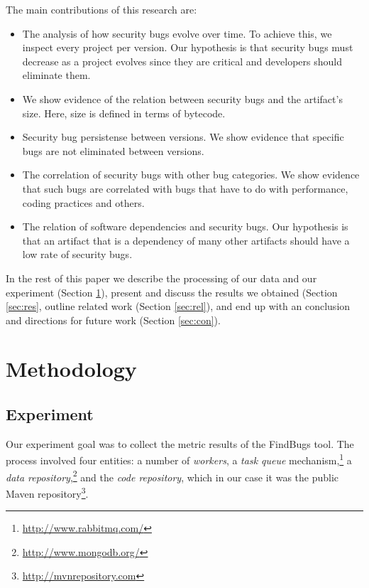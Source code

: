 \documentclass[conference]{IEEEtran}
\begin{document}
The main contributions of this research are:

\begin{itemize}
	\item The analysis of how security bugs evolve over time. To achieve
this, we inspect every project per version. Our hypothesis is that security
bugs must decrease as a project evolves since they are critical and developers
should eliminate them.
	\item We show evidence of the relation between security bugs and the artifact's size.  Here, size is
defined in terms of bytecode.
	\item Security bug persistense between versions. We show evidence that specific bugs are
not eliminated between versions.
	\item The correlation of security bugs with other bug categories. We
show evidence that such bugs are correlated with bugs that have to do with
performance, coding practices and others.
	\item The relation of software dependencies and security bugs. Our
hypothesis is that an artifact that is a dependency of many other artifacts
should have a low rate of security bugs. 
\end{itemize}

In the rest of this paper we
describe the processing of our data and our experiment (Section \ref{sec:meth}),
present and discuss the results we obtained (Section \ref{sec:res},
outline related work (Section \ref{sec:rel}),
and end up with an conclusion and directions for future work (Section \ref{sec:con}).

\section{Methodology}
\label{sec:meth}

\subsection{Experiment}
\label{sec:exp}

Our experiment goal was to collect the metric results of the FindBugs tool.
The process involved four entities: a number of {\it workers}, a
{\it task queue} mechanism,\footnote{\url{http://www.rabbitmq.com/}}
a {\it data repository},\footnote{\url{http://www.mongodb.org/}}
and the {\it code repository}, which in our case it was the public Maven 
repository\footnote{\url{http://mvnrepository.com}}.
\end{document}
